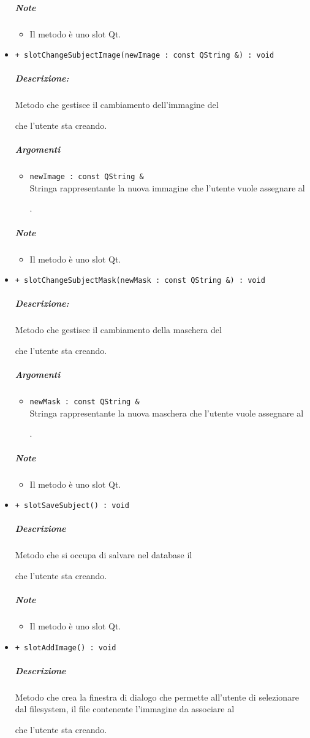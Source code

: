 \begin{itemize}
			\subparagraph{Note}
			\begin{itemize}
				\item Il metodo è uno slot\g{} Qt\g{}.
			\end{itemize}
			\item \color{blue} \verb!+ slotChangeSubjectImage(newImage : const QString &) : void!
			\color{black}
			\subparagraph{Descrizione:} Metodo che gestisce il cambiamento dell'immagine del \subject{} che l'utente sta creando.
			\color{black}
			\subparagraph{Argomenti}
			\begin{itemize}
				\item \color{RoyalPurple} \verb!newImage : const QString &!\\				
\color{black} Stringa rappresentante la nuova immagine che l'utente vuole assegnare al \subject{}.
			\end{itemize}
			\subparagraph{Note}
			\begin{itemize}
				\item Il metodo è uno slot\g{} Qt\g{}.
			\end{itemize}
			\item \color{blue} \verb!+ slotChangeSubjectMask(newMask : const QString &) : void!
			\color{black}
			\subparagraph{Descrizione:} Metodo che gestisce il cambiamento della maschera del \subject{} che l'utente sta creando.
			\color{black}
			\subparagraph{Argomenti}
			\begin{itemize}
				\item \color{RoyalPurple} \verb!newMask : const QString &!\\				
\color{black} Stringa rappresentante la nuova maschera che l'utente vuole assegnare al \subject{}.
			\end{itemize}
			\subparagraph{Note}
			\begin{itemize}
				\item Il metodo è uno slot\g{} Qt\g{}.
			\end{itemize}
			\item \color{blue} \verb!+ slotSaveSubject() : void!
			\color{black}
			\subparagraph{Descrizione} Metodo che si occupa di salvare nel database il \subject{} che l'utente sta creando.
			\subparagraph{Note}
			\begin{itemize}
				\item Il metodo è uno slot\g{} Qt\g{}.
			\end{itemize}
			\item \color{blue} \verb!+ slotAddImage() : void!
			\color{black}
			\subparagraph{Descrizione} Metodo che crea la finestra di dialogo che permette all'utente di selezionare dal filesystem, il file contenente l'immagine da associare al \subject{} che l'utente sta creando.

\end{itemize}
